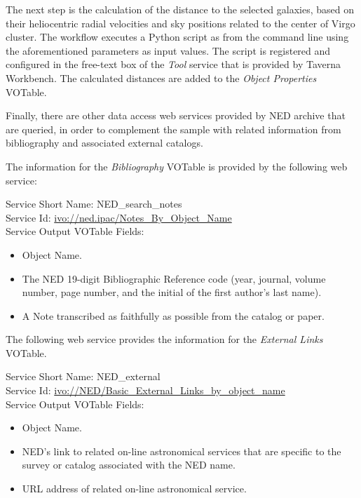 \documentclass[final,authoryear,5p,times,twocolumn]{elsarticle}
\begin{document}
The next step is the calculation of the distance to the selected galaxies, based on their heliocentric radial velocities and sky positions related to the center of Virgo cluster. The workflow executes a Python script as from the command line using the aforementioned parameters as input values. The script is registered and configured in the free-text box of the \textit{Tool} service that is provided by Taverna Workbench. The calculated distances are added to the \textit{Object Properties} VOTable. 

Finally, there are other data access web services provided by NED archive that are queried, in order to complement the sample with related information from bibliography and associated external catalogs. 

The information for the \textit{Bibliography} VOTable is provided by the following web service:

\begin{minipage}[h]{0.9\columnwidth}
  \small \vspace{\baselineskip}
\noindent Service Short Name: NED\_search\_notes\\
Service Id: \url{ivo://ned.ipac/Notes\_By\_Object\_Name}\\
Service Output VOTable Fields:
\begin{itemize}
\item Object Name.
\item The NED 19-digit Bibliographic Reference code (year, journal, volume number, page number, and the initial of the first author's last name).
\item A Note transcribed as faithfully as possible from the catalog or paper.
\end{itemize}
\vspace{\baselineskip}
\end{minipage}

\begin{samepage}
The following web service provides the information for the \textit{External Links} VOTable.

\begin{minipage}[h]{0.9\columnwidth}
  \small \vspace{\baselineskip}
\noindent Service Short Name: NED\_external\\
Service Id: \url{ivo://NED/Basic\_External\_Links\_by\_object\_name}\\
Service Output VOTable Fields:
\begin{itemize}
\item Object Name.
\item NED's link to related on-line astronomical services that are specific to the survey or catalog associated with the NED name.
\item URL address of related on-line astronomical service.
\end{itemize}
\vspace{\baselineskip}
\end{minipage}
\end{samepage}
\end{document}

